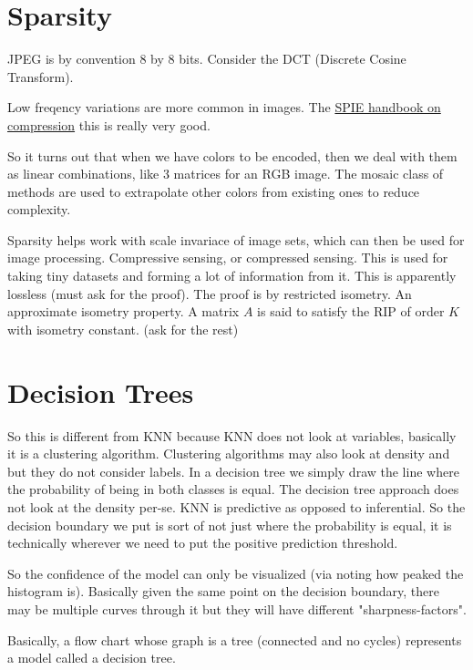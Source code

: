 \documentclass[12pt,a4paper,oneside,headinclude]{scrartcl}
\numberwithin{figure}{section}
\numberwithin{equation}{section}
\numberwithin{table}{section}
\renewenvironment{quote}{\begin{customblockquote}\list{}{\rightmargin=0em\leftmargin=0em}%
\item\relax\color{blockquote-text}\ignorespaces}{\unskip\unskip\endlist\end{customblockquote}}
\begin{document}
\section{Sparsity}
\label{sec:org17ba4c6}
JPEG is by convention 8 by 8 bits. Consider the DCT (Discrete Cosine Transform).

Low freqency variations are more common in images. The \href{https://spie.org/publications/book/34917}{SPIE handbook on
compression} this is really very good.

So it turns out that when we have colors to be encoded, then we deal with them
as linear combinations, like 3 matrices for an RGB image. The mosaic class of
methods are used to extrapolate other colors from existing ones to reduce
complexity.

Sparsity helps work with scale invariace of image sets, which can then be used
for image processing. Compressive sensing, or compressed sensing. This is used
for taking tiny datasets and forming a lot of information from it. This is
apparently lossless (must ask for the proof). The proof is by restricted
isometry. An approximate isometry property. A matrix \(A\) is said to satisfy the
RIP of order \(K\) with isometry constant. (ask for the rest)
\section{Decision Trees}
\label{sec:org15b838d}
So this is different from KNN because KNN does not look at variables, basically
it is a clustering algorithm. Clustering algorithms may also look at density and
but they do not consider labels. In a decision tree we simply draw the line where
the probability of being in both classes is equal. The decision tree approach
does not look at the density per-se. KNN is predictive as opposed to
inferential. So the decision boundary we put is sort of not just where the
probability is equal, it is technically wherever we need to put the positive
prediction threshold.

So the confidence of the model can only be visualized (via noting how peaked the
histogram is). Basically given the same point on the decision boundary, there
may be multiple curves through it but they will have different
"sharpness-factors".

\begin{quote}
Basically, a flow chart whose graph is a tree (connected and no cycles)
represents a model called a decision tree.
\end{quote}
\end{document}
